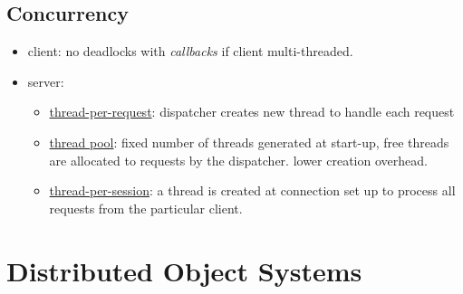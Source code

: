 \documentclass[twocolumn,landscape,10pt]{article}
\theoremstyle{definition}
\begin{document}
\subsection{Concurrency}

\begin{itemize}
    \item client: no deadlocks with \emph{callbacks} if client multi-threaded.
    \item server:
        \begin{itemize}
            \item \underline{thread-per-request}: dispatcher creates new thread to handle
                each request
            \item \underline{thread pool}: fixed number of threads generated at start-up,
                free threads are allocated to requests by the dispatcher. lower
                creation overhead.
            \item \underline{thread-per-session}: a thread is created at connection set up
                to process all requests from the particular client.
        \end{itemize} 
\end{itemize} 


\section{Distributed Object Systems}
\end{document}
